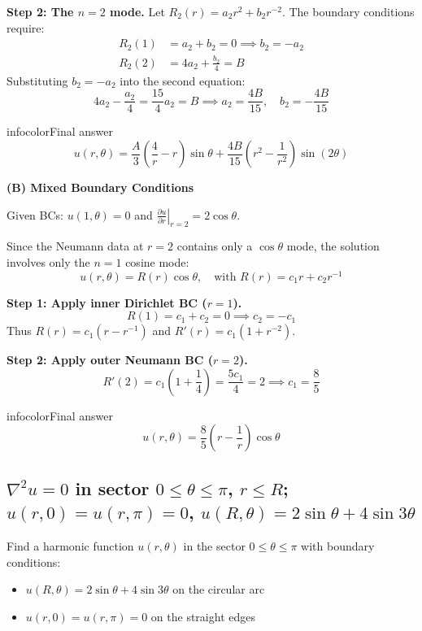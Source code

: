 \documentclass[a4paper,11pt]{article} %
\newenvironment{summarybox}[1][]{\begin{custombox}[#1]{infocolor}{Final answer}}{\end{custombox}}
\begin{document}
\textbf{Step 2: The $n=2$ mode.}
Let $R_2(r) = a_2 r^2 + b_2 r^{-2}$. The boundary conditions require:
\begin{align*}
    R_2(1) &= a_2 + b_2 = 0 \implies b_2 = -a_2 \\
    R_2(2) &= 4a_2 + \frac{b_2}{4} = B
\end{align*}
Substituting $b_2 = -a_2$ into the second equation:
$$ 4a_2 - \frac{a_2}{4} = \frac{15}{4}a_2 = B \implies a_2 = \frac{4B}{15}, \quad b_2 = -\frac{4B}{15} $$

\begin{summarybox}[title={Part A Answer}]
$$ u(r, \theta) = \frac{A}{3} \left( \frac{4}{r} - r \right) \sin\theta + \frac{4B}{15} \left( r^2 - \frac{1}{r^2} \right) \sin(2\theta) $$
\end{summarybox}

\textbf{(B) Mixed Boundary Conditions}

Given BCs: $u(1, \theta) = 0$ and $\left.\frac{\partial u}{\partial r}\right|_{r=2} = 2\cos\theta$.

Since the Neumann data at $r=2$ contains only a $\cos\theta$ mode, the solution involves only the $n=1$ cosine mode:
$$ u(r, \theta) = R(r) \cos\theta, \quad \text{with } R(r) = c_1 r + c_2 r^{-1} $$

\textbf{Step 1: Apply inner Dirichlet BC ($r=1$).}
$$ R(1) = c_1 + c_2 = 0 \implies c_2 = -c_1 $$
Thus $R(r) = c_1(r - r^{-1})$ and $R'(r) = c_1(1 + r^{-2})$.

\textbf{Step 2: Apply outer Neumann BC ($r=2$).}
$$ R'(2) = c_1 \left( 1 + \frac{1}{4} \right) = \frac{5c_1}{4} = 2 \implies c_1 = \frac{8}{5} $$

\begin{summarybox}[title={Part B Answer}]
$$ u(r, \theta) = \frac{8}{5} \left( r - \frac{1}{r} \right) \cos\theta $$
\end{summarybox}
\subsection{\texorpdfstring{$\nabla^2 u = 0$ in sector $0\le\theta\le\pi$, $r\le R$; $u(r,0)=u(r,\pi)=0$, $u(R,\theta)=2\sin\theta+4\sin 3\theta$}{Laplace in half-disk: Dirichlet on straight edges, two-mode sine data on arc}}

\begin{problembox}
Find a harmonic function $u(r,\theta)$ in the sector $0 \le \theta \le \pi$ with boundary conditions:
\begin{itemize}
    \item $u(R, \theta) = 2\sin\theta + 4\sin 3\theta$ on the circular arc
    \item $u(r, 0) = u(r, \pi) = 0$ on the straight edges
\end{itemize}
\end{problembox}
\end{document}
